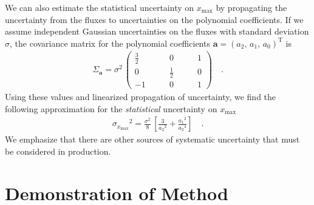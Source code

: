 \documentclass[rnaas]{aastex62}
\newcommand{\T}{\ensuremath{\mathrm{T}}}
\newcommand{\bvec}[1]{{\ensuremath{\boldsymbol{#1}}}}
\begin{document}
We can also estimate the statistical uncertainty on $x_\mathrm{max}$ by
propagating the uncertainty from the fluxes to uncertainties on the polynomial
coefficients.
If we assume independent Gaussian uncertainties on the fluxes with standard
deviation $\sigma$, the covariance matrix for the polynomial coefficients
$\bvec{a} = {(a_2,\,a_1,\,a_0)}^\T$ is
\begin{eqnarray}
\Sigma_\bvec{a} = \sigma^2\,\left(\begin{array}{ccc}
\frac{3}{2} \quad & \quad 0 \quad &\quad 1 \\
0\quad &\quad \frac{1}{2}\quad &\quad 0 \\
-1\quad &\quad 0\quad &\quad 1
\end{array}\right)\quad.
\end{eqnarray}
Using these values and linearized propagation of uncertainty, we find the
following approximation for the \emph{statistical} uncertainty on
$x_\mathrm{max}$
\begin{eqnarray}
{\sigma_{x_\mathrm{max}}}^2 = \frac{\sigma^2}{8}\,\left[
    \frac{3}{{a_2}^2} + \frac{{a_1}^2}{{a_2}^4}
\right]\quad.
\end{eqnarray}
We emphasize that there are other sources of systematic uncertainty that must
be considered in production.

\section{Demonstration of Method}
\end{document}
